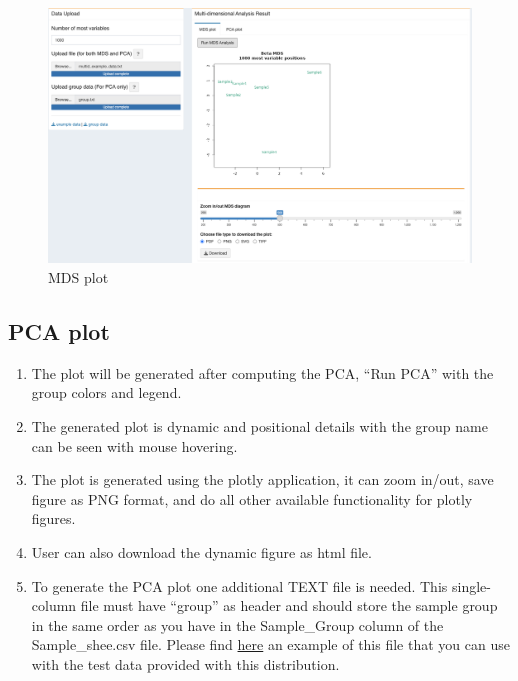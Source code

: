 \documentclass[
  a4paper,
  oneside,
  open=any]{scrreport}
\providecommand{\tightlist}{%
  \setlength{\itemsep}{0pt}\setlength{\parskip}{0pt}}\usepackage{longtable,booktabs,array}
\begin{document}
\begin{figure}[H]

{\centering \includegraphics{./_images/mdsPlot.png}

}

\caption{MDS plot}

\end{figure}

\hypertarget{pca-plot}{%
\subsection{PCA plot}\label{pca-plot}}

\begin{enumerate}
\def\labelenumi{\arabic{enumi}.}
\tightlist
\item
  The plot will be generated after computing the PCA, ``Run PCA'' with
  the group colors and legend.
\item
  The generated plot is dynamic and positional details with the group
  name can be seen with mouse hovering.
\item
  The plot is generated using the plotly application, it can zoom
  in/out, save figure as PNG format, and do all other available
  functionality for plotly figures.
\item
  User can also download the dynamic figure as html file.
\item
  To generate the PCA plot one additional TEXT file is needed. This
  single-column file must have ``group'' as header and should store the
  sample group in the same order as you have in the Sample\_Group column
  of the Sample\_shee.csv file. Please find
  \href{https://github.com/JD2112/methylr/blob/main/data/groupData.txt}{here}
  an example of this file that you can use with the test data provided
  with this distribution.\\
\end{enumerate}
\end{document}

